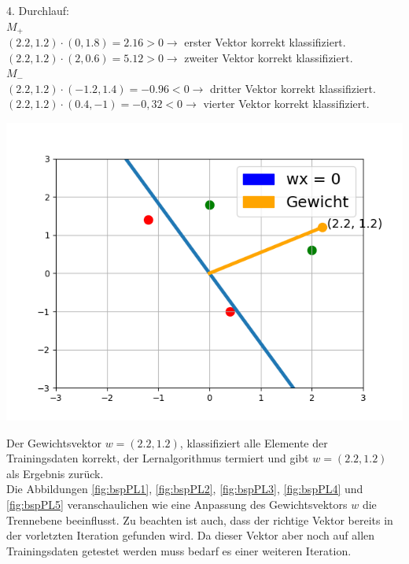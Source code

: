 \documentclass[fontsize=11pt]{scrartcl}
\newenvironment{Figure}
  {\par\medskip\noindent\minipage{\linewidth}}
  {\endminipage\par\medskip}
\begin{document}
                        4. Durchlauf:\\
                        $M_+$\\
                        $(2.2,1.2)\cdot (0,1.8) = 2.16 > 0 \rightarrow$ erster Vektor korrekt klassifiziert.\\
                        $(2.2,1.2)\cdot (2,0.6) = 5.12 > 0 \rightarrow$ zweiter Vektor korrekt klassifiziert.\\
                        $M_-$\\
                        $(2.2,1.2)\cdot (-1.2,1.4) = -0.96 < 0 \rightarrow$ dritter Vektor korrekt klassifiziert.\\
                        $(2.2,1.2)\cdot (0.4,-1) = -0,32 < 0 \rightarrow$ vierter Vektor korrekt klassifiziert.
                        \begin{Figure}
                            \centering
                            \includegraphics[scale=0.5]{bsp4.png}
                            \label{fig:bspPL5}    
                        \end{Figure}
                        Der Gewichtsvektor $w = (2.2,1.2)$, klassifiziert alle Elemente der Trainingsdaten korrekt, der Lernalgorithmus termiert und gibt $w = (2.2,1.2)$ als Ergebnis zurück.\\
                        Die Abbildungen \ref{fig:bspPL1}, \ref{fig:bspPL2}, \ref{fig:bspPL3}, \ref{fig:bspPL4} und \ref{fig:bspPL5} veranschaulichen wie eine Anpassung des Gewichtsvektors $w$ die Trennebene beeinflusst.
                        Zu beachten ist auch, dass der richtige Vektor bereits in der vorletzten Iteration gefunden wird. Da dieser Vektor aber noch auf allen Trainingsdaten getestet werden muss bedarf es einer weiteren Iteration.
\end{document}
